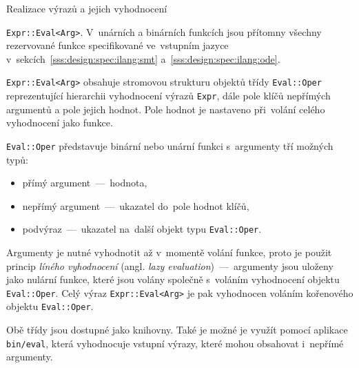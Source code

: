 \documentclass[thesis=M,czech]{FITthesis}[2012/06/26]
\newcommand{\id}[1]{\texttt{#1}}
\newcommand{\hl}[1]{\textit{#1}}
\newcommand{\name}[1]{\hl{#1}}
\newcommand{\rf}[1]{\ref{#1}}
\begin{document}
\begin{section}{Realizace výrazů a jejich vyhodnocení}
\begin{paragraph}{\id{Expr::\-Eval<Arg>}.}
V~unárních a binárních funkcích jsou přítomny všechny
rezervované funkce specifikované ve~vstupním jazyce
v~sekcích~\rf{sss:design:spec:ilang:smt} a~\rf{sss:design:spec:ilang:ode}.

\id{Expr::\-Eval<Arg>} obsahuje stromovou strukturu
objektů třídy \id{Eval::\-Oper}
reprezentující hierarchii vyhodnocení výrazů \id{Expr},
dále pole klíčů nepřímých argumentů a pole jejich hodnot.
Pole hodnot je nastaveno při~volání celého vyhodnocení jako funkce.

\id{Eval::\-Oper} představuje binární nebo unární funkci
s~argumenty tří možných typů:
\begin{itemize}
\item přímý argument~---~hodnota,
\item nepřímý argument~---~ukazatel do~pole hodnot klíčů,
\item podvýraz~---~ukazatel na~další objekt typu \id{Eval::\-Oper}.
\end{itemize}
Argumenty je nutné vyhodnotit až v~momentě volání funkce,
proto je použit princip \name{líného vyhodnocení}
(angl. \name{lazy evaluation})~---~argumenty jsou uloženy
jako nulární funkce, které jsou volány společně
s~voláním vyhodnocení objektu \id{Eval::\-Oper}.
Celý výraz \id{Expr::\-Eval<Arg>} je pak vyhodnocen
voláním kořenového objektu \id{Eval::\-Oper}.
\end{paragraph} %


\bigskip

Obě třídy jsou dostupné jako knihovny.
Také je možné je využít pomocí aplikace \id{bin/eval},
která vyhodnocuje vstupní výrazy,
které mohou obsahovat i~nepřímé argumenty.
\end{section} %

\end{document}
